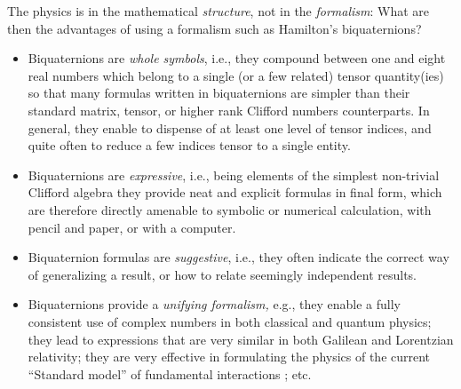 \documentclass [12pt,a4paper      ]{article}
\begin{document}
The physics is in the mathematical \emph{structure}, not in the \emph{formalism}: What are then the advantages of using a formalism such as Hamilton's biquaternions?
\begin{itemize}

\item Biquaternions are {\it whole symbols}, i.e., they compound between one and eight real numbers which belong to a single (or a few related) tensor quantity(ies) so that many formulas written in biquaternions are simpler than their standard matrix, tensor, or higher rank Clifford numbers counterparts. In general, they enable to dispense of at least one level of tensor indices, and quite often to reduce a few indices tensor to a single entity.
  
\item Biquaternions are {\it expressive}, i.e., being elements of the simplest non-trivial Clifford algebra they provide neat and  explicit 
formulas in final form,  which are therefore directly amenable to symbolic or numerical calculation, with pencil and paper, or with a computer.

\item Biquaternion formulas are {\it suggestive}, i.e., they often indicate the correct way of generalizing a result, or how to relate seemingly independent results.



\item Biquaternions provide a {\it unifying formalism,} e.g., they enable a fully consistent use of complex numbers in both classical and quantum physics; they lead to expressions that are very similar in both Galilean and Lorentzian relativity; they are very effective in formulating the physics of the current ``Standard model'' of fundamental interactions \cite{R27,R35,R60}; etc.



\end{itemize}
\end{document}
